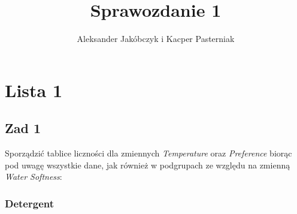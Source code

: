 \documentclass[12pt]{mwart}\usepackage[]{graphicx}\usepackage[]{color}
\title{Sprawozdanie 1}
\author{Aleksander Jakóbczyk i Kacper Pasterniak}
\date{}
\begin{document}
	\maketitle 
	

	
	\section*{Lista 1}
  \subsection*{Zad 1}
  Sporządzić tablice liczności dla zmiennych \textit{Temperature} oraz \textit{Preference} biorąc pod uwagę wszystkie dane, jak również w podgrupach ze względu na zmienną \textit{Water Softness}:
  \subsubsection*{Detergent}
\end{document}
